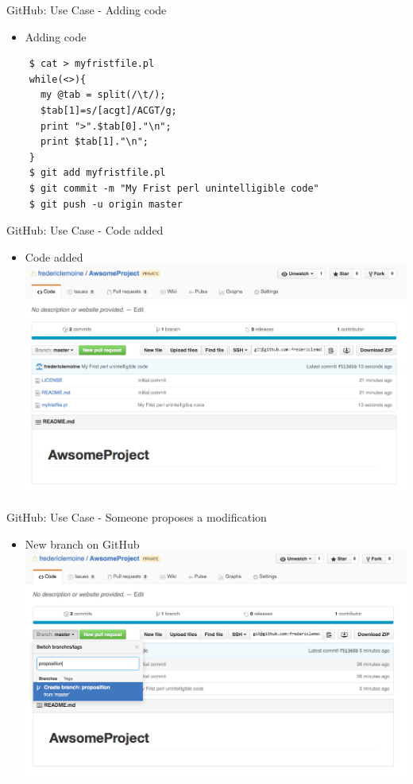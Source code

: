 \begin{frame}[fragile]{GitHub: Use Case - Adding code}
  \begin{itemize}
  \item Adding code
  \end{itemize}
  \begin{lstlisting}
    $ cat > myfristfile.pl
    while(<>){
      my @tab = split(/\t/);
      $tab[1]=s/[acgt]/ACGT/g;
      print ">".$tab[0]."\n";
      print $tab[1]."\n";
    }
    $ git add myfristfile.pl
    $ git commit -m "My Frist perl unintelligible code"
    $ git push -u origin master
    \end{lstlisting}
\end{frame}

\begin{frame}{GitHub: Use Case - Code added}
  \begin{itemize}
  \item Code added
    \includegraphics[width=\textwidth]{images/hosting_services_use_case_3.png}
  \end{itemize}
\end{frame}

\begin{frame}{GitHub: Use Case - Someone proposes a modification}
  \begin{itemize}
  \item New branch on GitHub
    \includegraphics[width=\textwidth]{images/hosting_services_use_case_4.png}
  \end{itemize}
\end{frame}

